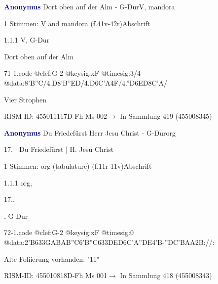 \documentclass[twocolumn]{book}
\begin{document}
\par \vspace{7pt} \textcolor{darkblue}{\textbf{Anonymus  }}\hfillplus{\textbf{[71]}}\newline Dort oben auf der Alm - G-Dur\newline V, mandora
\par \begin{itshape}\end{itshape} 
\par \textcolor{darkblue}{}  1 Stimmen: V and mandora  (f.41v-42r)\newline Abschrift
\par 1.1.1  V, G-Dur\newline \begin{footnotesize} Dort oben auf der Alm \end{footnotesize}  
\begin{filecontents*}{71-1.code}
@clef:G-2
@keysig:xF
@timesig:3/4
@data:{8'B''C}/4.D8'B''ED/4.D{6C'A}4F/4.''D{6ED}{8C'A}/
\end{filecontents*}
\newline
%
\par Vier Strophen
\par RISM-ID: 455011117\newline D-Fh  Ms 002\newline $\rightarrow$ In Sammlung 419 (455008345)
      
\par \vspace{7pt} \textcolor{darkblue}{\textbf{Anonymus  }}\hfillplus{\textbf{[72]}}\newline Du Friedefürst Herr Jesu Christ - G-Dur\newline org
\par \begin{itshape}[f.11r, at left:] 17. | Du Friedefürst | H. Jesu Christ\end{itshape} 
\par \textcolor{darkblue}{}  1 Stimmen: org (tabulature)  (f.11r-11v)\newline Abschrift
\par 1.1.1  org, \begin{itshape}17..\end{itshape}, G-Dur  
\begin{filecontents*}{72-1.code}
@clef:G-2
@keysig:xF
@timesig:0
@data:2'B{633GAB}{AB''C}{6'B''C}{633DED}{6C'A''DE}4'B-''DC'BAA2B://:
\end{filecontents*}
\newline
%
\par Alte Foliierung vorhanden: "11"
\par RISM-ID: 455010818\newline D-Fh  Ms 001\newline $\rightarrow$ In Sammlung 418 (455008343)
      
\end{document}
